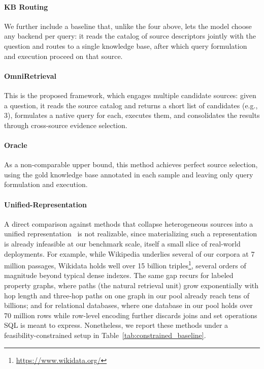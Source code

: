 \documentclass{llmxive}
\begin{document}
\vspace{-0.025in}
\paragraph{KB Routing}
We further include a baseline that, unlike the four above, lets the model choose any backend per query: it reads the catalog of source descriptors jointly with the question and routes to a single knowledge base, after which query formulation and execution proceed on that source.

\vspace{-0.025in}
\paragraph{OmniRetrieval}
This is the proposed framework, which engages multiple candidate sources: given a question, it reads the source catalog and returns a short list of candidates (e.g., 3), formulates a native query for each, executes them, and consolidates the results through cross-source evidence selection.

\vspace{-0.025in}
\paragraph{Oracle}
As a non-comparable upper bound, this method achieves perfect source selection, using the gold knowledge base annotated in each sample and leaving only query formulation and execution.

\vspace{-0.025in}
\paragraph{Unified-Representation}
A direct comparison against methods that collapse heterogeneous sources into a unified representation~\citep{UniK, UDT, DiFaR} is not realizable, since materializing such a representation is already infeasible at our benchmark scale, itself a small slice of real-world deployments. For example, while Wikipedia underlies several of our corpora at 7 million passages, Wikidata holds well over 15 billion triples\footnote{\url{https://www.wikidata.org/}}, several orders of magnitude beyond typical dense indexes. The same gap recurs for labeled property graphs, where paths (the natural retrieval unit) grow exponentially with hop length and three-hop paths on one graph in our pool already reach tens of billions; and for relational databases, where one database in our pool holds over 70 million rows while row-level encoding further discards joins and set operations SQL is meant to express. Nonetheless, we report these methods under a feasibility-constrained setup in Table~\ref{tab:constrained_baseline}.
\end{document}
